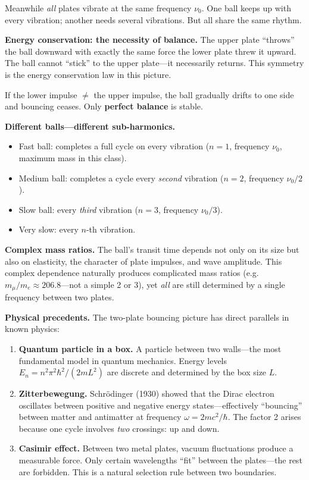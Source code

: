 \documentclass[11pt]{article}
\begin{document}
Meanwhile \emph{all} plates vibrate at the same frequency $\nu_0$.
One ball keeps up with every vibration; another needs several
vibrations. But all share the same rhythm.

\medskip
\textbf{Energy conservation: the necessity of balance.}
The upper plate ``throws'' the ball downward with exactly the same
force the lower plate threw it upward. The ball cannot ``stick'' to
the upper plate---it necessarily returns. This symmetry is the
energy conservation law in this picture.

If the lower impulse $\neq$ the upper impulse, the ball gradually
drifts to one side and bouncing ceases. Only \textbf{perfect
balance} is stable.

\medskip
\textbf{Different balls---different sub-harmonics.}
\begin{itemize}
  \item Fast ball: completes a full cycle on every vibration
    ($n = 1$, frequency $\nu_0$, maximum mass in this class).
  \item Medium ball: completes a cycle every \emph{second}
    vibration ($n = 2$, frequency $\nu_0/2$).
  \item Slow ball: every \emph{third} vibration
    ($n = 3$, frequency $\nu_0/3$).
  \item Very slow: every $n$-th vibration.
\end{itemize}

\medskip
\textbf{Complex mass ratios.}
The ball's transit time depends not only on its size but also on
elasticity, the character of plate impulses, and wave amplitude.
This complex dependence naturally produces complicated mass ratios
(e.g.\ $m_\mu/m_e \approx 206.8$---not a simple 2 or 3), yet
\emph{all} are still determined by a single frequency between two
plates.

\medskip
\textbf{Physical precedents.}
The two-plate bouncing picture has direct parallels in known
physics:
\begin{enumerate}
  \item \textbf{Quantum particle in a box.} A particle between two
    walls---the most fundamental model in quantum mechanics. Energy
    levels $E_n = n^2\pi^2\hbar^2/(2mL^2)$ are discrete and
    determined by the box size $L$.
  \item \textbf{Zitterbewegung.} Schr\"odinger (1930) showed that
    the Dirac electron oscillates between positive and negative
    energy states---effectively ``bouncing'' between matter and
    antimatter at frequency $\omega = 2mc^2/\hbar$. The factor 2
    arises because one cycle involves \emph{two} crossings: up and
    down.
  \item \textbf{Casimir effect.} Between two metal plates, vacuum
    fluctuations produce a measurable force. Only certain
    wavelengths ``fit'' between the plates---the rest are
    forbidden. This is a natural selection rule between two
    boundaries.
\end{enumerate}
\end{document}

